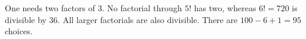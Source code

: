 One needs two factors of 3. No factorial through $5!$ has two, whereas $6!=720$ is divisible by 36. All larger factorials are also divisible. There are $100-6+1=\boxed{95}$ choices.
